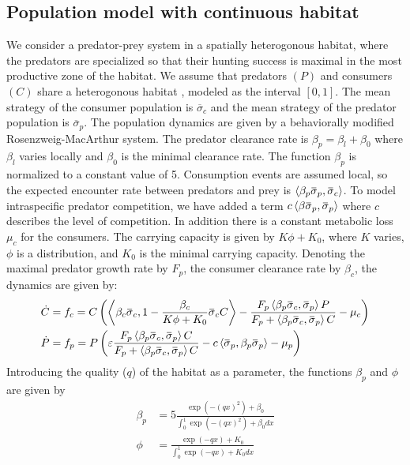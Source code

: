 \subsection*{Population model with continuous habitat}
We consider a predator-prey system in a spatially heterogonous habitat, where the predators are specialized so that their hunting success is maximal in the most productive zone of the habitat.
We assume that predators $(P)$ and consumers $(C)$ share a heterogonous habitat , modeled as the interval $[0,1]$. The mean strategy of the consumer population is $\overbar{\sigma}_c$ and the mean strategy of the predator population is $\overbar{\sigma}_p$.
The population dynamics are given by a behaviorally modified Rosenzweig-MacArthur system. The predator clearance rate is $\beta_p = \beta_{l} + \beta_0$ where $\beta_l$ varies locally and $\beta_0$ is the minimal clearance rate. The function $\beta_p$ is normalized to a constant value of 5.
Consumption events are assumed local, so the expected encounter rate between predators and prey is $\ip{\beta_p \overbar{\sigma}_p}{\overbar{\sigma}_c}$. To model intraspecific predator competition, we have added a term $c\ip{\beta \overbar{\sigma}_p}{\overbar{\sigma}_p}$ where $c$ describes the level of competition. In addition there is a constant metabolic loss $\mu_c$ for the consumers. The carrying capacity is given by $K\phi + K_0$,
 where $K$ varies, $\phi$ is a distribution, and $K_0$ is the minimal carrying capacity. Denoting the maximal predator growth rate by $F_p$, the consumer clearance rate by $\beta_c$, the dynamics are given by:
\begin{align}
  \dot{C} &= f_c = C \pa{\ip{\beta_c \overbar{\sigma}_c}{1-\frac{\beta_c}{K\phi + K_0}\overbar{\sigma}_c C} - \frac{F_p \ip{\beta_p \overbar{\sigma}_c}{\overbar{\sigma}_p} P}{F_p + \ip{\beta_p \overbar{\sigma}_c}{\overbar{\sigma}_p} C} - \mu_c} \\
  \dot{P} &= f_p = P \pa{\epsilon \frac{F_p \ip{\beta_p \overbar{\sigma}_c}{\overbar{\sigma}_p} C}{F_p + \ip{\beta_p \overbar{\sigma}_c}{\overbar{\sigma}_p} C} - c \ip{\overbar{\sigma}_p}{\beta_p \overbar{\sigma}_p}  - \mu_p}
  \label{eq:dynamics}
\end{align}
Introducing the quality ($q$) of the habitat as a parameter, the functions $\beta_p$ and $\phi$ are given by
\begin{align}
  \beta_p &= 5 \frac{\exp(-(q x)^2) + \beta_0}{\int_0^1 \exp(-(q x)^2) + \beta_0 dx} \\
  \phi &= \frac{\exp(-q x) + K_0}{\int_0^1 \exp(-q x) + K_0 dx}
\end{align}
